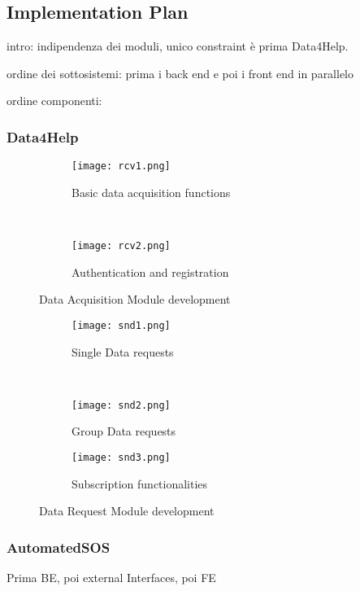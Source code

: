 \subsection{Implementation Plan}

intro: indipendenza dei moduli, unico constraint è prima Data4Help.

ordine dei sottosistemi: prima i back end e poi i front end in parallelo

ordine componenti:

\subsubsection{Data4Help}

\FloatBarrier
\begin{figure*}[ht!]
	\centering
	\begin{subfigure}[t]{0.5\textwidth}
		\centering
		\texttt{[image: rcv1.png]}
		\caption{Basic data acquisition functions}
	\end{subfigure}%
	~ 
	\begin{subfigure}[t]{0.5\textwidth}
		\centering
		\texttt{[image: rcv2.png]}
		\caption{Authentication and registration}
	\end{subfigure}
	
	\caption{Data Acquisition Module development}
\end{figure*}
\FloatBarrier

\FloatBarrier
\begin{figure*}[ht!]
	\centering
	\begin{subfigure}[t]{0.5\textwidth}
		\centering
		\texttt{[image: snd1.png]}
		\caption{Single Data requests}
	\end{subfigure}%
	~ \vspace{20px}
	\begin{subfigure}[t]{0.5\textwidth}
		\centering
		\texttt{[image: snd2.png]}
		\caption{Group Data requests}
	\end{subfigure}

	\begin{subfigure}[t]{0.8\textwidth}
		\centering
		\texttt{[image: snd3.png]}
		\caption{Subscription functionalities}
	\end{subfigure}
	
	\caption{Data Request Module development}
\end{figure*}
\FloatBarrier

\subsubsection{AutomatedSOS}
Prima BE, poi external Interfaces, poi FE

